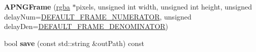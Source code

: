 \begin{DoxyCompactItemize}
\item 
\hypertarget{classapngasm_1_1APNGFrame_a5c198819ee96017ca012e5e89dbe635c}{{\bfseries A\-P\-N\-G\-Frame} (\hyperlink{structapngasm_1_1rgba}{rgba} $\ast$pixels, unsigned int width, unsigned int height, unsigned delay\-Num=\hyperlink{namespaceapngasm_a5b334b6957e14291ff8f76cab562f60f}{D\-E\-F\-A\-U\-L\-T\-\_\-\-F\-R\-A\-M\-E\-\_\-\-N\-U\-M\-E\-R\-A\-T\-O\-R}, unsigned delay\-Den=\hyperlink{namespaceapngasm_a867b3acbcc2624faf6b3e82732110594}{D\-E\-F\-A\-U\-L\-T\-\_\-\-F\-R\-A\-M\-E\-\_\-\-D\-E\-N\-O\-M\-I\-N\-A\-T\-O\-R})}\label{classapngasm_1_1APNGFrame_a5c198819ee96017ca012e5e89dbe635c}

\item 
\hypertarget{classapngasm_1_1APNGFrame_aa24ea3ac279325e3a97dc0fac6337d20}{bool {\bfseries save} (const std\-::string \&out\-Path) const }\label{classapngasm_1_1APNGFrame_aa24ea3ac279325e3a97dc0fac6337d20}

\end{DoxyCompactItemize}
